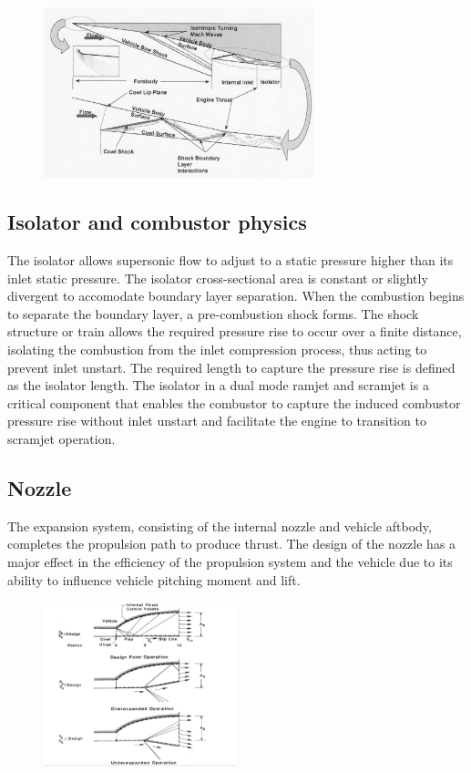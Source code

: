 \documentclass[12pt]{article}
\begin{document}
\begin{figure}[!ht]
\centering
\includegraphics[width=0.7\textwidth]{figures/scram2.png}
\end{figure}

\subsection{Isolator and combustor physics}

The isolator allows supersonic flow to adjust to a static pressure higher than its inlet static pressure. The isolator cross-sectional area is constant or slightly divergent to accomodate boundary layer separation. When the combustion begins to separate the boundary layer, a pre-combustion shock forms. The shock structure or train allows the required pressure rise to occur over a finite distance, isolating the combustion from the inlet compression process, thus acting to prevent inlet unstart. The required length to capture the pressure rise is defined as the isolator length. The isolator in a dual mode ramjet and scramjet is a critical component that enables the combustor to capture the induced combustor pressure rise without inlet unstart and facilitate the engine to transition to scramjet operation.

\subsection{Nozzle}

The expansion system, consisting of the internal nozzle and vehicle aftbody, completes the propulsion path to produce thrust. The design of the nozzle has a major effect in the efficiency of the propulsion system and the vehicle due to its ability to influence vehicle pitching moment and lift.

\begin{figure}[!ht]
\centering
\includegraphics[width=0.5\textwidth]{figures/scramnozzle.png}
\end{figure}
\end{document}
